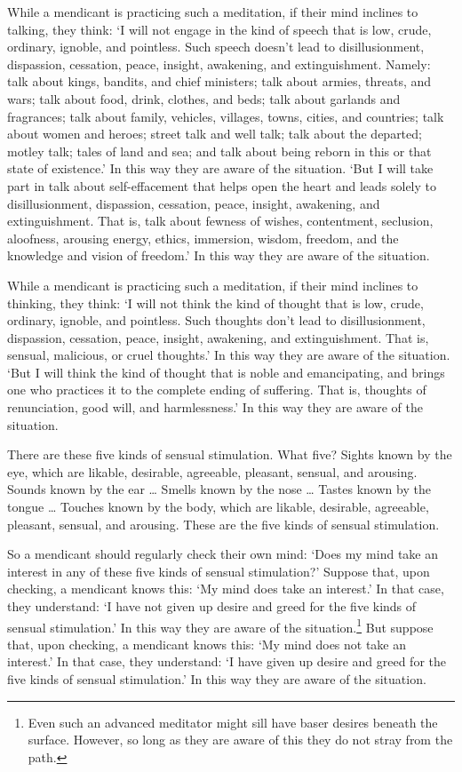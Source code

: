 \documentclass[12pt,openany]{book}%
\begin{document}
While a mendicant is practicing such a meditation, if their mind inclines to talking, they think: ‘I will not engage in the kind of speech that is low, crude, ordinary, ignoble, and pointless. Such speech doesn’t lead to disillusionment, dispassion, cessation, peace, insight, awakening, and extinguishment. Namely: talk about kings, bandits, and chief ministers; talk about armies, threats, and wars; talk about food, drink, clothes, and beds; talk about garlands and fragrances; talk about family, vehicles, villages, towns, cities, and countries; talk about women and heroes; street talk and well talk; talk about the departed; motley talk; tales of land and sea; and talk about being reborn in this or that state of existence.’ In this way they are aware of the situation. ‘But I will take part in talk about self-effacement that helps open the heart and leads solely to disillusionment, dispassion, cessation, peace, insight, awakening, and extinguishment. That is, talk about fewness of wishes, contentment, seclusion, aloofness, arousing energy, ethics, immersion, wisdom, freedom, and the knowledge and vision of freedom.’ In this way they are aware of the situation. 

While a mendicant is practicing such a meditation, if their mind inclines to thinking, they think: ‘I will not think the kind of thought that is low, crude, ordinary, ignoble, and pointless. Such thoughts don’t lead to disillusionment, dispassion, cessation, peace, insight, awakening, and extinguishment. That is, sensual, malicious, or cruel thoughts.’ In this way they are aware of the situation. ‘But I will think the kind of thought that is noble and emancipating, and brings one who practices it to the complete ending of suffering. That is, thoughts of renunciation, good will, and harmlessness.’ In this way they are aware of the situation. 

There are these five kinds of sensual stimulation. What five? Sights known by the eye, which are likable, desirable, agreeable, pleasant, sensual, and arousing. Sounds known by the ear … Smells known by the nose … Tastes known by the tongue … Touches known by the body, which are likable, desirable, agreeable, pleasant, sensual, and arousing. These are the five kinds of sensual stimulation. 

So a mendicant should regularly check their own mind: ‘Does my mind take an interest in any of these five kinds of sensual stimulation?’ Suppose that, upon checking, a mendicant knows this: ‘My mind does take an interest.’ In that case, they understand: ‘I have not given up desire and greed for the five kinds of sensual stimulation.’ In this way they are aware of the situation.\footnote{Even such an advanced meditator might sill have baser desires beneath the surface. However, so long as they are aware of this they do not stray from the path. } But suppose that, upon checking, a mendicant knows this: ‘My mind does not take an interest.’ In that case, they understand: ‘I have given up desire and greed for the five kinds of sensual stimulation.’ In this way they are aware of the situation. 
\end{document}
